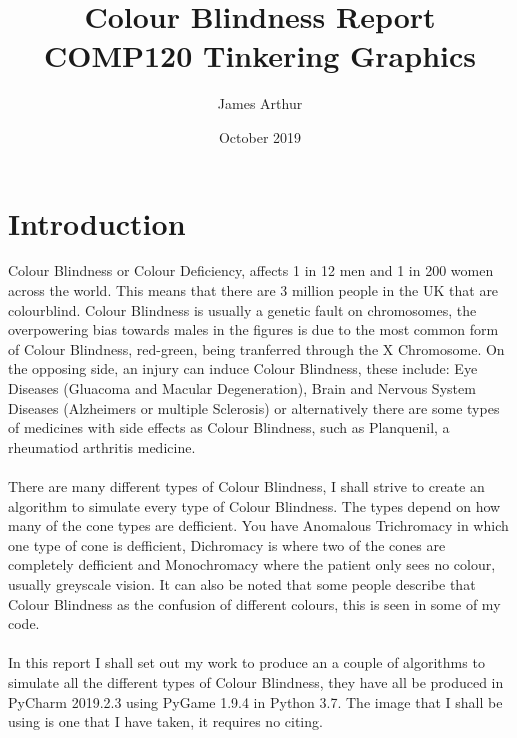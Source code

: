 \documentclass{Report}
\title{Colour Blindness Report\\[\subtitlelinesep]\smaller[\subtitlerelsize]{}COMP120 Tinkering Graphics}
\author{James Arthur}
\date{October 2019}
\begin{document}
\maketitle

\section{Introduction}
Colour Blindness or Colour Deficiency, affects 1 in 12 men and 1 in 200 women across the world.\autocite[1]{CBA} This means that there are 3 million people in the UK that are colourblind. Colour Blindness is usually a genetic fault on chromosomes, the overpowering bias towards males in the figures is due to the most common form of Colour Blindness, red-green, being tranferred through the X Chromosome.\autocite[2]{copsin} On the opposing side, an injury can induce Colour Blindness, these include: Eye Diseases (Gluacoma and Macular Degeneration), Brain and Nervous System Diseases (Alzheimers or multiple Sclerosis) or alternatively there are some types of medicines with side effects as Colour Blindness, such as Planquenil, a rheumatiod arthritis medicine. \autocite[3]{NIH}\\\\

There are many different types of Colour Blindness, I shall strive to create an algorithm to simulate every type of Colour Blindness. The types depend on how many of the cone types are defficient.  You have Anomalous Trichromacy in which one type of cone is defficient, Dichromacy is where two of the cones are completely defficient and Monochromacy where the patient only sees no colour, usually greyscale vision.\autocite[4]{Types} It can also be noted that some people describe that Colour Blindness as the confusion of different colours, this is seen in some of my code. \autocite[5]{NHS} \\\\

In this report I shall set out my work to produce an a couple of algorithms to simulate all the different types of Colour Blindness, they have all be produced in PyCharm 2019.2.3 using PyGame 1.9.4 in Python 3.7. The image that I shall be using is one that I have taken, it requires no citing.


\newpage

\printbibliography
\end{document}
